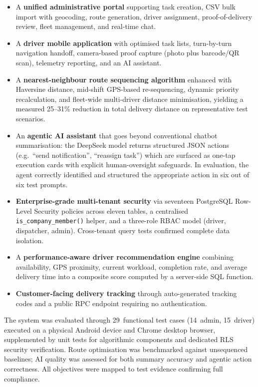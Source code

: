 \begin{itemize}
  \item A \textbf{unified administrative portal} supporting task creation, CSV
        bulk import with geocoding, route generation, driver assignment, proof-of-delivery
        review, fleet management, and real-time chat.
  \item A \textbf{driver mobile application} with optimised task lists, turn-by-turn
        navigation handoff, camera-based proof capture (photo plus barcode/QR scan),
        telemetry reporting, and an AI assistant.
  \item A \textbf{nearest-neighbour route sequencing algorithm} enhanced with
        Haversine distance, mid-shift GPS-based re-sequencing, dynamic priority
        recalculation, and fleet-wide multi-driver distance minimisation, yielding a
        measured 25--31\% reduction in total delivery distance on representative
        test scenarios.
  \item An \textbf{agentic AI assistant} that goes beyond conventional chatbot
        summarisation: the DeepSeek model returns structured JSON actions
        (e.g.\ ``send notification'', ``reassign task'') which are surfaced as
        one-tap execution cards with explicit human-oversight safeguards.  In
        evaluation, the agent correctly identified and structured the appropriate
        action in six out of six test prompts.
  \item \textbf{Enterprise-grade multi-tenant security} via seventeen PostgreSQL
        Row-Level Security policies across eleven tables, a centralised
        \texttt{is\_company\_member()} helper, and a three-role RBAC model
        (driver, dispatcher, admin).  Cross-tenant query tests confirmed
        complete data isolation.
  \item A \textbf{performance-aware driver recommendation engine} combining
        availability, GPS proximity, current workload, completion rate, and average
        delivery time into a composite score computed by a server-side SQL function.
  \item \textbf{Customer-facing delivery tracking} through auto-generated
        tracking codes and a public RPC endpoint requiring no authentication.
\end{itemize}

The system was evaluated through 29~functional test cases (14~admin, 15~driver)
executed on a physical Android device and Chrome desktop browser, supplemented by
unit tests for algorithmic components and dedicated RLS security verification.
Route optimisation was benchmarked against unsequenced baselines; AI quality
was assessed for both summary accuracy and agentic action correctness.
All objectives were mapped to test evidence confirming full compliance.

